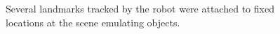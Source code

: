 \documentclass[letterpaper, 10 pt, conference]{ieeeconf}  %
\begin{document}
\begin{figure}[h!]
	\begin{center}
		
	\end{center}
	\caption{Several landmarks tracked by the robot were attached to fixed locations at the scene emulating objects.}
	\label{fig:exp_scene}
\end{figure}
\end{document}
